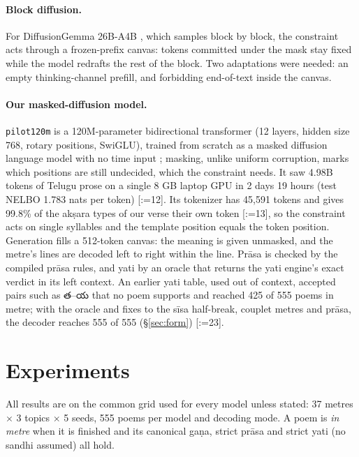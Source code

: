 \documentclass[11pt]{article}
\makeatletter
\newcommand{\te}[1]{{\telugufont #1}}
\DeclareRobustCommand{\exref}[1]{{\scriptsize[\def\ex@sep{}\@for\ex@i:=#1\do{\ex@sep
  \expandafter\ex@item\expandafter{\ex@i}\def\ex@sep{, }}]}}
\newcommand{\ex@item}[1]{\in@{-}{#1}\ifin@\ex@range#1\@nil\else\ex@link{#1}\fi}
\def\ex@range#1-#2\@nil{\ex@link{#1}--\ex@link{#2}}
\newcommand{\ex@link}[1]{\hyperref[exp:E#1]{E#1}}
\makeatother
\begin{document}
\paragraph{Block diffusion.} For DiffusionGemma 26B-A4B \citep{hf_diffusiongemma}, which samples block by
block, the constraint acts through a frozen-prefix canvas: tokens committed under the mask stay fixed while
the model redrafts the rest of the block. Two adaptations were needed: an empty thinking-channel prefill,
and forbidding end-of-text inside the canvas.

\paragraph{Our masked-diffusion model.} \texttt{pilot120m} is a 120M-parameter bidirectional transformer
(12 layers, hidden size 768, rotary positions, SwiGLU), trained from scratch as a masked diffusion language
model \citep{sahoo2024mdlm} with no time input \citep{ou2025radd}; masking, unlike uniform corruption,
marks which positions are still undecided, which the constraint needs. It saw 4.98B tokens of Telugu prose
on a single 8 GB laptop GPU in 2 days 19 hours (test NELBO 1.783 nats per token) \exref{12}. Its tokenizer has 45,591
tokens and gives 99.8\% of the akṣara types of our verse their own token \exref{13}, so the constraint acts on single
syllables and the template position equals the token position. Generation fills a 512-token canvas: the
meaning is given unmasked, and the metre's lines are decoded left to right within the line. Prāsa is
checked by the compiled prāsa rules, and yati by an oracle that returns the yati engine's exact verdict in
its left context. An earlier yati table, used out of context, accepted pairs such as \te{త}--\te{య} that no
poem supports and reached 425 of 555 poems in metre; with the oracle and fixes to the sīsa half-break,
couplet metres and prāsa, the decoder reaches 555 of 555 (\S\ref{sec:form}) \exref{23}.

\section{Experiments}\label{sec:experiments}

All results are on the common grid used for every model unless stated: 37 metres $\times$ 3 topics
$\times$ 5 seeds, 555 poems per model and decoding mode. A poem is \emph{in metre} when it is finished and
its canonical gaṇa, strict prāsa and strict yati (no sandhi assumed) all hold.
\end{document}
